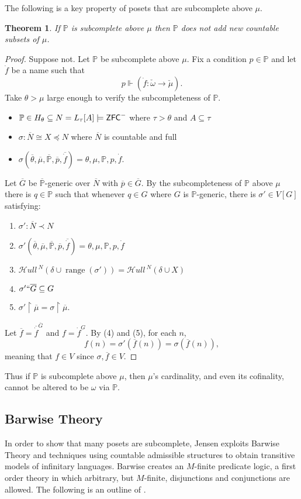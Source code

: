 \documentclass{amsart}
\newtheorem{theorem}{Theorem}[section]
\theoremstyle{definition}
\theoremstyle{remark}
\renewcommand{\P}{\mathbb{P}}
\newcommand{\N}{{\overline{N}}}
\newcommand{\G}{\overline{G}}
\newcommand{\ZFC}{\textup{\ensuremath{\textsf{ZFC}}}}
\DeclareMathOperator{\ran}{range}
\newcommand{\forces}{\Vdash}
\newcommand{\rest}{\mathbin{\upharpoonright}}
\newcommand{\SH}{\mathcal{H}\textit{ull} \,}
\newcommand{\sk}[3]{\SH^{#1}( {#2} \cup {\ran(#3)} ) }
\newcommand{\Sk}[3]{\SH^{#1}( {#2} \cup {#3} ) }
\begin{document}
The following is a key property of posets that are subcomplete above \(\mu\).
\begin{theorem} If $\P$ is subcomplete above $\mu$ then $\P$ does not add new countable subsets of $\mu$. \end{theorem}
\begin{proof}
Suppose not. Let $\P$ be subcomplete above $\mu$. 
Fix a condition \(p\in\P\) and let $\dot{f}$ be a name such that
	$$p \forces \left( \dot f: \check \omega \to \check{\mu} \right).$$ 
Take $\theta > \mu$ large enough to verify the subcompleteness of $\P$. \begin{itemize}
	\item $\P \in H_\theta \subseteq N = L_\tau[A] \models \ZFC^-$ where $\tau>\theta$ and $A \subseteq \tau$
	\item $\sigma: \N \cong X \preccurlyeq N$ where $\N$ is countable and full
	\item $\sigma(\overline \theta, \overline \mu, \overline{\P}, \overline p, \overline{\dot f})=\theta, \mu, \P, p, \dot f$.
\end{itemize}
Let $\G$ be $\overline{\P}$-generic over $\N$ with $\overline p \in \overline G$. By the subcompleteness of $\P$ above $\mu$ there is $q \in \P$ such that whenever $q \in G$ where $G$ is $\P$-generic, there is $\sigma' \in V[G]$ satisfying: \begin{enumerate}
	\item $\sigma': \N \prec N$
	\item $\sigma'(\overline \theta, \overline \mu, \overline{\P}, \overline p, \overline{\dot f})=\theta, \mu, \P, p, \dot f$
	\item $\sk{N}{\delta}{\sigma'} = \Sk{N}{\delta}{X}$
	\item $\sigma'``\G \subseteq G$
	\item $\sigma' \rest \overline \mu = \sigma \rest \overline \mu$.
\end{enumerate}
Let $\overline f = \overline{\dot f}^{\G}$ and $f = \dot f^G$. By (4) and (5), for each $n$, $$f(n)=\sigma'(\overline f(n)) = \sigma(\overline f(n)),$$ meaning that $f \in V$ since $\sigma,\overline{f} \in V$.
\end{proof}
Thus if $\P$ is subcomplete above $\mu$, then $\mu$'s cardinality, and even its cofinality, cannot be altered to be $\omega$ via $\P$.



\subsection{Barwise Theory}
\label{subsec:BarwiseTheory}
In order to show that many posets are subcomplete, Jensen exploits Barwise Theory and techniques using countable admissible structures to obtain transitive models of infinitary languages. Barwise creates an $M$-finite predicate logic, a first order theory in which arbitrary, but $M$-finite, disjunctions and conjunctions are allowed. The following is an outline of \cite[Chapter 1 \& 2]{Jensen:2012fr}. 
\end{document}

